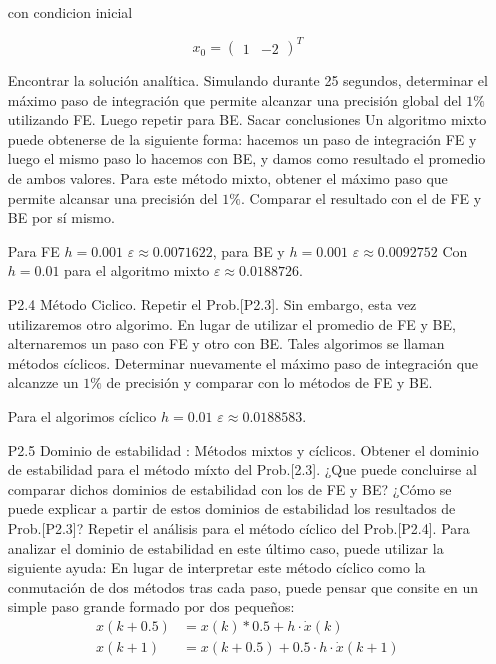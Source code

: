 \documentclass{article}
\begin{document}
\begin{itemize}
con condicion inicial

\begin{equation}
x_0 = \begin{pmatrix} 1 & -2\end{pmatrix}^T
 \label{P2.3b} \tag{P2.3b}
\end{equation}

Encontrar la solución analítica. Simulando durante 25 segundos, determinar el máximo paso de integración que permite alcanzar una precisión global del $1\%$ utilizando FE. Luego repetir para BE. Sacar conclusiones
Un algoritmo mixto puede obtenerse de la siguiente forma: hacemos un paso de integración FE y luego el mismo paso lo hacemos con BE, y damos como resultado el promedio de ambos valores. Para este método mixto, obtener el máximo paso que permite alcansar una precisión del $1\%$. Comparar el resultado con el de FE y BE por sí mismo.

Para FE $h = 0.001$ $\varepsilon \approx 0.0071622$, para BE y $h = 0.001$ $\varepsilon \approx 0.0092752 $ 
Con $h = 0.01$ para el algoritmo mixto $\varepsilon \approx 0.0188726$.
\item[P2.4] Método Ciclico. Repetir el Prob.[P2.3]. Sin embargo, esta vez utilizaremos otro algorimo. En lugar de utilizar el promedio de FE y BE, alternaremos un paso con FE y otro con BE. Tales algorimos se llaman métodos cíclicos.
Determinar nuevamente el máximo paso de integración que alcanzze un $1\%$ de precisión y comparar con lo métodos de FE y BE.

Para el algorimos cíclico $h = 0.01$ $\varepsilon \approx 0.0188583$.

\item[P2.5] Dominio de estabilidad : Métodos mixtos y cíclicos. Obtener el dominio de estabilidad para el método míxto del Prob.[2.3]. ¿Que puede concluirse al comparar dichos dominios de estabilidad con los de FE y BE? ¿Cómo se puede explicar a partir de estos dominios de estabilidad los resultados de Prob.[P2.3]?
Repetir el análisis para el método cíclico del Prob.[P2.4]. Para analizar el dominio de estabilidad en este último caso, puede utilizar la siguiente ayuda:
En lugar de interpretar este método cíclico como la conmutación de dos métodos tras cada paso, puede pensar que consite en un simple paso grande formado por dos pequeños:
\begin{align}
	x(k+0.5) &= x(k) * 0.5 + h \cdot \dot{x}(k) \tag{P2.5a} \\
	x(k+1)   &= x(k + 0.5) + 0.5 \cdot h \cdot \dot{x}(k+1) \tag{P2.5b}
\end{align}


\end{itemize}
\end{document}
